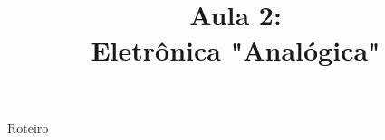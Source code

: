 


\title{Aula 2: \\ Eletrônica "Analógica"}





\begin{frame}

	\maketitle

\end{frame}


\begin{frame}{Roteiro}

	\tableofcontents

\end{frame}






